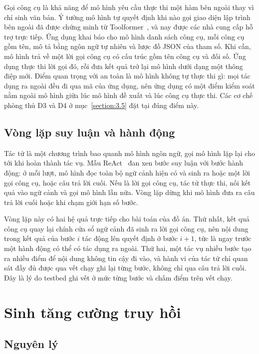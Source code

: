 \documentclass[../DoAn.tex]{subfiles}
\begin{document}
Gọi công cụ là khả năng để mô hình yêu cầu thực thi một hàm bên ngoài thay vì chỉ sinh văn bản. Ý tưởng mô hình tự quyết định khi nào gọi giao diện lập trình bên ngoài đã được chứng minh từ Toolformer~\cite{schick2023toolformer}, và nay được các nhà cung cấp hỗ trợ trực tiếp. Ứng dụng khai báo cho mô hình danh sách công cụ, mỗi công cụ gồm tên, mô tả bằng ngôn ngữ tự nhiên và lược đồ JSON của tham số. Khi cần, mô hình trả về một lời gọi công cụ có cấu trúc gồm tên công cụ và đối số. Ứng dụng thực thi lời gọi đó, rồi đưa kết quả trở lại mô hình dưới dạng một thông điệp mới. Điểm quan trọng với an toàn là mô hình không tự thực thi gì: mọi tác dụng ra ngoài đều đi qua mã của ứng dụng, nên ứng dụng có một điểm kiểm soát nằm ngoài mô hình giữa lúc mô hình đề xuất và lúc công cụ thực thi. Các cơ chế phòng thủ D3 và D4 ở mục~\ref{section:3.5} đặt tại đúng điểm này.

\subsection{Vòng lặp suy luận và hành động}
\label{subsection:3.1.2}

Tác tử là một chương trình bao quanh mô hình ngôn ngữ, gọi mô hình lặp lại cho tới khi hoàn thành tác vụ. Mẫu ReAct~\cite{yao2023react} đan xen bước suy luận với bước hành động: ở mỗi lượt, mô hình đọc toàn bộ ngữ cảnh hiện có và sinh ra hoặc một lời gọi công cụ, hoặc câu trả lời cuối. Nếu là lời gọi công cụ, tác tử thực thi, nối kết quả vào ngữ cảnh và gọi mô hình lần nữa. Vòng lặp dừng khi mô hình đưa ra câu trả lời cuối hoặc khi chạm giới hạn số bước.

Vòng lặp này có hai hệ quả trực tiếp cho bài toán của đồ án. Thứ nhất, kết quả công cụ quay lại chính cửa sổ ngữ cảnh đã sinh ra lời gọi công cụ, nên nội dung trong kết quả của bước $i$ tác động lên quyết định ở bước $i+1$, tức là ngay trước một hành động có thể có tác dụng ra ngoài. Thứ hai, một tác vụ nhiều bước tạo ra nhiều điểm để nội dung không tin cậy đi vào, và hành vi của tác tử chỉ quan sát đầy đủ được qua vết chạy ghi lại từng bước, không chỉ qua câu trả lời cuối. Đây là lý do testbed ghi vết ở mức từng bước và chấm điểm trên vết chạy.

\section{Sinh tăng cường truy hồi}
\label{section:3.2}

\subsection{Nguyên lý}
\label{subsection:3.2.1}
\end{document}
